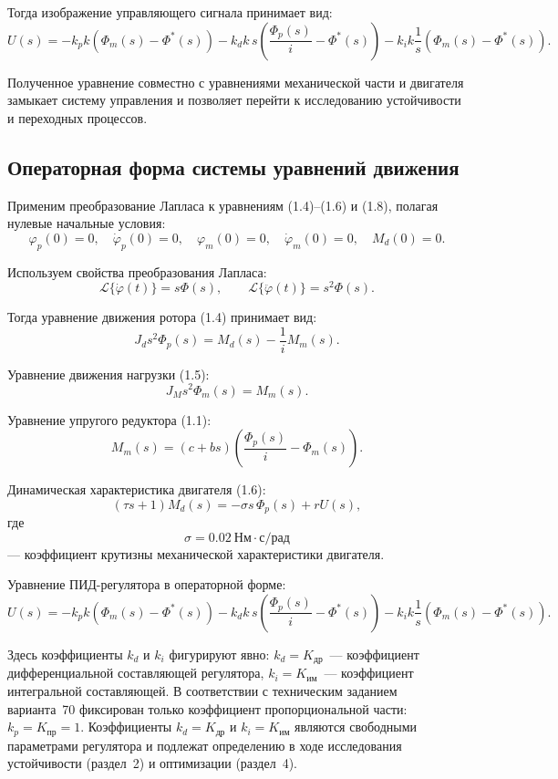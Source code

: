 \documentclass[a4paper, 14pt]{extarticle}
\begin{document}
Тогда изображение управляющего сигнала принимает вид:
\[
    U(s)=
    -k_p k\left(\Phi_m(s)-\Phi^*(s)\right)
    -k_d k\, s\left(\frac{\Phi_p(s)}{i}-\Phi^*(s)\right)
    -k_i k\frac{1}{s}\left(\Phi_m(s)-\Phi^*(s)\right).
    \tag{1.8}
\]

Полученное уравнение совместно с уравнениями механической части и двигателя замыкает систему управления и позволяет перейти к исследованию устойчивости и переходных процессов.

\subsection{Операторная форма системы уравнений движения}

Применим преобразование Лапласа к уравнениям (1.4)–(1.6) и (1.8), полагая нулевые начальные условия:
\[
    \varphi_p(0)=0,\quad
    \dot{\varphi}_p(0)=0,\quad
    \varphi_m(0)=0,\quad
    \dot{\varphi}_m(0)=0,\quad
    M_d(0)=0.
\]

Используем свойства преобразования Лапласа:
\[
    \mathcal{L}\{\dot{\varphi}(t)\}=s\Phi(s),
    \qquad
    \mathcal{L}\{\ddot{\varphi}(t)\}=s^2\Phi(s).
\]

Тогда уравнение движения ротора (1.4) принимает вид:
\[
    J_d s^2 \Phi_p(s)
    =
    M_d(s)-\frac{1}{i}M_m(s).
    \tag{1.9}
\]

Уравнение движения нагрузки (1.5):
\[
    J_M s^2 \Phi_m(s)=M_m(s).
    \tag{1.10}
\]

Уравнение упругого редуктора (1.1):
\[
    M_m(s)=
    (c+bs)
    \left(
    \frac{\Phi_p(s)}{i}-\Phi_m(s)
    \right).
    \tag{1.11}
\]

Динамическая характеристика двигателя (1.6):
\[
    (\tau s+1)M_d(s)=
    -\sigma s\,\Phi_p(s)+rU(s),
    \tag{1.12}
\]
где
\[
    \sigma = 0.02\ \text{Нм}\cdot\text{с/рад}
\]
— коэффициент крутизны механической характеристики двигателя.

Уравнение ПИД-регулятора в операторной форме:
\[
    U(s)=
    -k_p k\left(\Phi_m(s)-\Phi^*(s)\right)
    -k_d k\,s
    \left(
    \frac{\Phi_p(s)}{i}
    -\Phi^*(s)
    \right)
    -k_i k
    \frac{1}{s}
    \left(
    \Phi_m(s)-\Phi^*(s)
    \right).
    \tag{1.13}
\]

Здесь коэффициенты $k_d$ и $k_i$ фигурируют явно:
$k_d = K_{\text{др}}$~--- коэффициент дифференциальной составляющей регулятора,
$k_i = K_{\text{им}}$~--- коэффициент интегральной составляющей.
В соответствии с техническим заданием варианта~70 фиксирован только
коэффициент пропорциональной части: $k_p = K_{\text{пр}} = 1$.
Коэффициенты $k_d = K_{\text{др}}$ и $k_i = K_{\text{им}}$ являются
свободными параметрами регулятора и подлежат определению в ходе
исследования устойчивости (раздел~2) и оптимизации (раздел~4).
\end{document}
